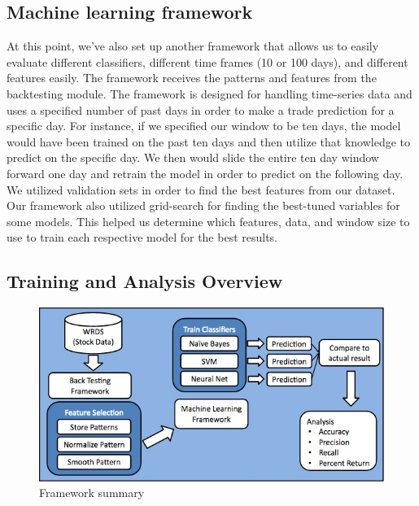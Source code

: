 \documentclass{article}
\begin{document}
\subsection{Machine learning framework}
At this point, we've also set up another framework that allows us to easily evaluate different classifiers, different time frames (10 or 100 days), and different features easily. The framework receives the patterns and features from the backtesting module. The framework is designed for handling time-series data and uses a specified number of past days in order to make a trade prediction for a specific day. For instance, if we specified our window to be ten days, the model would have been trained on the past ten days and then utilize that knowledge to predict on the specific day. We then would slide the entire ten day window forward one day and retrain the model in order to predict on the following day. We utilized validation sets in order to find the best features from our dataset. Our framework also utilized grid-search for finding the best-tuned variables for some models. This helped us determine which features, data, and window size to use to train each respective model for the best results.

\subsection{Training and Analysis Overview}
\begin{figure}[h!]
\begin{center}
        \includegraphics[scale=0.37]{summary_fig}
        \caption{Framework summary}
\end{center}
\end{figure}
\end{document}
